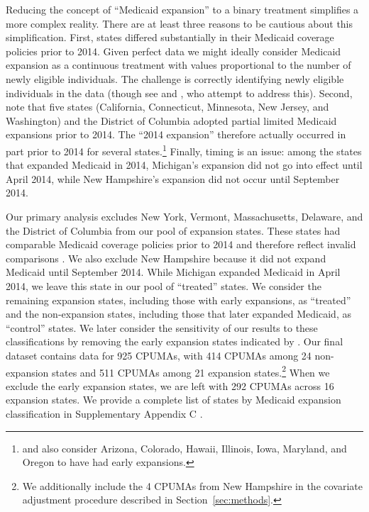 \documentclass[aoas]{imsart}
\theoremstyle{plain}
\theoremstyle{remark}
\begin{document}
Reducing the concept of ``Medicaid expansion'' to a binary treatment simplifies a more complex reality. There are at least three reasons to be cautious about this simplification. First, states differed substantially in their Medicaid coverage policies prior to 2014. Given perfect data we might ideally consider Medicaid expansion as a continuous treatment with values proportional to the number of newly eligible individuals. The challenge is correctly identifying newly eligible individuals in the data (though see \citet{frean2017premium} and \citet{miller2021medicaid}, who attempt to address this). Second, \citet{frean2017premium} note that five states (California, Connecticut, Minnesota, New Jersey, and Washington) and the District of Columbia adopted partial limited Medicaid expansions prior to 2014. The ``2014 expansion'' therefore actually occurred in part prior to 2014 for several states.\footnote{\citet{kaestner2017effects} and \citet{courtemanche2017early} also consider Arizona, Colorado, Hawaii, Illinois, Iowa, Maryland, and Oregon to have had early expansions.} Finally, timing is an issue: among the states that expanded Medicaid in 2014, Michigan's expansion did not go into effect until April 2014, while New Hampshire's expansion did not occur until September 2014.

Our primary analysis excludes New York, Vermont, Massachusetts, Delaware, and the District of Columbia from our pool of expansion states. These states had comparable Medicaid coverage policies prior to 2014 and therefore reflect invalid comparisons \citep{kaestner2017effects}. We also exclude New Hampshire because it did not expand Medicaid until September 2014. While Michigan expanded Medicaid in April 2014, we leave this state in our pool of ``treated'' states. We consider the remaining expansion states, including those with early expansions, as ``treated'' and the non-expansion states, including those that later expanded Medicaid, as ``control'' states. We later consider the sensitivity of our results to these classifications by removing the early expansion states indicated by \citet{frean2017premium}. Our final dataset contains data for 925 CPUMAs, with 414 CPUMAs among 24 non-expansion states and 511 CPUMAs among 21 expansion states.\footnote{We additionally include the 4 CPUMAs from New Hampshire in the covariate adjustment procedure described in Section~\ref{sec:methods}.} When we exclude the early expansion states, we are left with 292 CPUMAs across 16 expansion states. We provide a complete list of states by Medicaid expansion classification in Supplementary Appendix C \citep{supplement}.
\end{document}
